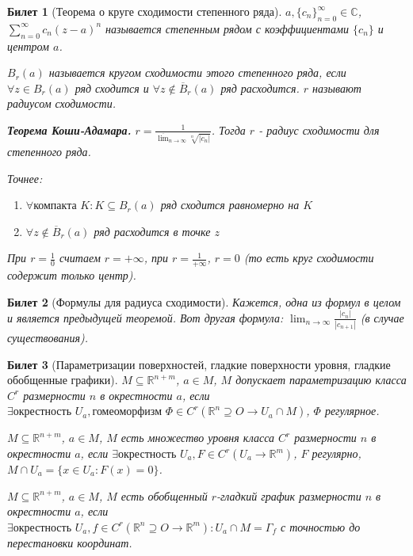 \documentclass[11pt,a4paper,oneside]{scrartcl}
\newtheorem{ticket}{Билет}
\begin{document}
\begin{ticket}[Теорема о круге сходимости степенного ряда]
    $a, \{c_n\}_{n=0}^\infty \in \mathbb{C}$, $\sum_{n=0}^\infty c_n (z-a)^n$ называется
    степенным рядом с коэффициентами $\{c_n\}$ и центром $a$.

    $B_r(a)$ называется кругом сходимости этого степенного ряда, если
    $\forall z \in B_r(a)$ ряд сходится и $\forall z \notin \overline{B}_r(a)$
    ряд расходится. $r$ называют радиусом сходимости.

    \textbf{Теорема Коши-Адамара.}
    $r = \frac{1}{\overline{\lim}_{n \rightarrow \infty} \sqrt[n]{|c_n|}}$.
    Тогда $r$ - радиус сходимости для степенного ряда.

    Точнее:
    \begin{enumerate}
        \item $\forall \text{компакта } K : K \subseteq B_r(a)$
            ряд сходится равномерно на $K$
        \item $\forall z \notin \overline{B}_r(a)$ ряд расходится в точке $z$
    \end{enumerate}

    При $r = \frac{1}{0}$ считаем $r = +\infty$, при $r = \frac{1}{+\infty}$,
    $r = 0$ (то есть круг сходимости содержит только центр).
\end{ticket}

\addtocounter{ticket}{-1}
\begin{ticket}[Формулы для радиуса сходимости]
    Кажется, одна из формул в целом и является предыдущей теоремой.
    Вот другая формула: $\lim_{n \rightarrow \infty} \frac{|c_n|}{|c_{n+1}|}$
    (в случае существования).
\end{ticket}

\setcounter{ticket}{19}
\addtocounter{ticket}{-1}
\begin{ticket}[Параметризации поверхностей, гладкие поверхности уровня, гладкие обобщенные графики]

    $M \subseteq \mathbb{R}^{n+m}$, $a \in M$, $M$ допускает параметризацию класса $C^r$
    размерности $n$ в окрестности $a$, если $\exists \text{окрестность } U_a,
    \text{гомеоморфизм } \Phi \in C^r (\mathbb{R}^n \supseteq O \rightarrow U_a \cap M)$,
    $\Phi$ регулярное.

    $M \subseteq \mathbb{R}^{n+m}$, $a \in M$, $M$ есть множество уровня класса $C^r$
    размерности $n$ в окрестности $a$, если $\exists \text{окрестность } U_a,
    F \in C^r(U_a \rightarrow \mathbb{R}^m)$, $F$ регулярно, $M \cap U_a = \{x \in U_a : F(x) = 0\}$.

    $M \subseteq \mathbb{R}^{n+m}$, $a \in M$, $M$ есть обобщенный $r$-гладкий график
    размерности $n$ в окрестности $a$, если \\ $\exists \text{окрестность } U_a,
    f \in C^r (\mathbb{R}^n \supseteq O \rightarrow \mathbb{R}^m) : U_a \cap M = \Gamma_f$
    с точностью до перестановки координат.
\end{ticket}
\end{document}
